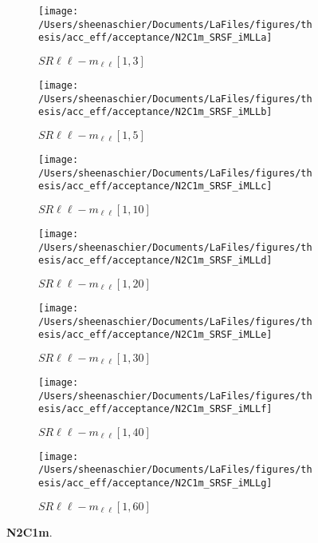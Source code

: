 \begin{figure}
        \centering
    \begin{subfigure}[b]{0.49\textwidth}
        \texttt{[image: /Users/sheenaschier/Documents/LaFiles/figures/thesis/acc\_eff/acceptance/N2C1m\_SRSF\_iMLLa]}
    \caption{$SR\ell\ell-m_{\ell\ell} [1, 3]$}
    \end{subfigure}
    \begin{subfigure}[b]{0.49\textwidth}
        \texttt{[image: /Users/sheenaschier/Documents/LaFiles/figures/thesis/acc\_eff/acceptance/N2C1m\_SRSF\_iMLLb]}
    \caption{$SR\ell\ell-m_{\ell\ell} [1, 5]$}
    \end{subfigure}
    \begin{subfigure}[b]{0.49\textwidth}
        \texttt{[image: /Users/sheenaschier/Documents/LaFiles/figures/thesis/acc\_eff/acceptance/N2C1m\_SRSF\_iMLLc]}
    \caption{$SR\ell\ell-m_{\ell\ell} [1, 10]$}
    \end{subfigure}
    \begin{subfigure}[b]{0.49\textwidth}
        \texttt{[image: /Users/sheenaschier/Documents/LaFiles/figures/thesis/acc\_eff/acceptance/N2C1m\_SRSF\_iMLLd]}
    \caption{$SR\ell\ell-m_{\ell\ell} [1, 20]$}
    \end{subfigure}
    \begin{subfigure}[b]{0.49\textwidth}
        \texttt{[image: /Users/sheenaschier/Documents/LaFiles/figures/thesis/acc\_eff/acceptance/N2C1m\_SRSF\_iMLLe]}
    \caption{$SR\ell\ell-m_{\ell\ell} [1, 30]$}
    \end{subfigure}
    \begin{subfigure}[b]{0.49\textwidth}
        \texttt{[image: /Users/sheenaschier/Documents/LaFiles/figures/thesis/acc\_eff/acceptance/N2C1m\_SRSF\_iMLLf]}
    \caption{$SR\ell\ell-m_{\ell\ell} [1, 40]$}
    \end{subfigure}
    \begin{subfigure}[b]{0.49\textwidth}
        \texttt{[image: /Users/sheenaschier/Documents/LaFiles/figures/thesis/acc\_eff/acceptance/N2C1m\_SRSF\_iMLLg]}
    \caption{$SR\ell\ell-m_{\ell\ell} [1, 60]$}
    \end{subfigure}
    \caption{\textbf{N2C1m}.}
\end{figure}


